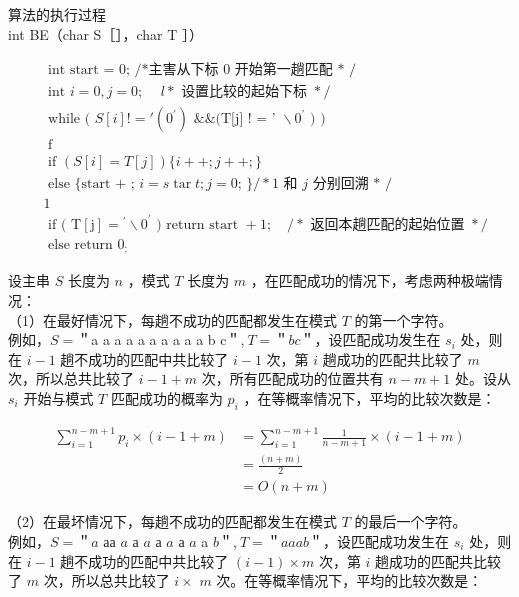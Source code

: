 \documentclass[10pt]{article}
\begin{document}
算法的执行过程\\
int BE（char S［］，char T ］）

$$
\begin{aligned}
& \text { int start = 0; /*主害从下标 0 开始第一趟匹配 * / } \\
& \text { int } i=0, j=0 \text {; } \quad l * \text { 设置比较的起始下标 } * / \\
& \text { while ( } S[i]!='\left(0^{\prime}\right) \text { \&\& (T[j] ! = ' } \backslash 0^{\prime} \text { ) ) } \\
& \text { f } \\
& \text { if }(S[i]=T[j])\{i++; j++;\} \\
& \text { else \{ start + ; } i=s \operatorname{tar} t ; j=0 \text {; \} } / * 1 \text { 和 } j \text { 分别回溯 * / } \\
& 1 \\
& \text { if ( } \mathrm{T}[\mathrm{j}]={ }^{\prime} \backslash 0^{\prime} \text { ) return start }+1 ; \quad / * \text { 返回本趟匹配的起始位置 } * / \\
& \text { else return } 0_{\text {; }}
\end{aligned}
$$

设主串 $S$ 长度为 $n$ ，模式 $T$ 长度为 $m$ ，在匹配成功的情况下，考虑两种极端情况：\\
（1）在最好情况下，每趟不成功的匹配都发生在模式 $T$ 的第一个字符。\\
例如，$S=$＂a a a a a a a a a a b c＂,$~ T=$＂$b c$＂，设匹配成功发生在 $s_{i}$ 处，则在 $i-1$ 趟不成功的匹配中共比较了 $i-1$ 次，第 $i$ 趟成功的匹配共比较了 $m$ 次，所以总共比较了 $i-1+m$ 次，所有匹配成功的位置共有 $n-m+1$ 处。设从 $s_{i}$ 开始与模式 $T$ 匹配成功的概率为 $p_{i}$ ，在等概率情况下，平均的比较次数是：

$$
\begin{aligned}
\sum_{i=1}^{n-m+1} p_{i} \times(i-1+m) & =\sum_{i=1}^{n-m+1} \frac{1}{n-m+1} \times(i-1+m) \\
& =\frac{(n+m)}{2} \\
& =O(n+m)
\end{aligned}
$$

（2）在最坏情况下，每趟不成功的匹配都发生在模式 $T$ 的最后一个字符。\\
例如，$S=$＂$a$ аа $a$ а $a$ а $a$ а $a$ a $b$＂,$~ T=$＂$a a a b$＂，设匹配成功发生在 $s_{i}$ 处，则在 $i-1$ 趟不成功的匹配中共比较了 $(i-1) \times m$ 次，第 $i$ 趟成功的匹配共比较了 $m$ 次，所以总共比较了 $i \times$ $m$ 次。在等概率情况下，平均的比较次数是：
\end{document}
